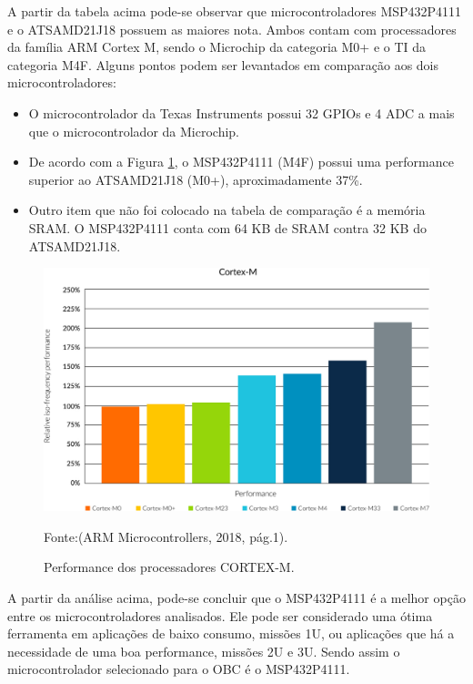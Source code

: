 A partir da tabela acima pode-se observar que microcontroladores MSP432P4111 e o ATSAMD21J18 possuem as maiores nota. Ambos contam com processadores da família ARM Cortex M, sendo o Microchip da categoria M0+ e o TI da categoria M4F. Alguns pontos podem ser levantados em comparação aos dois microcontroladores:

\begin{itemize}
\item O microcontrolador da Texas Instruments possui 32 GPIOs e 4 ADC a mais que o microcontrolador da Microchip.

\item De acordo com a Figura \ref{fig18}, o MSP432P4111 (M4F) possui uma performance superior ao ATSAMD21J18 (M0+), aproximadamente 37\%.

\item Outro item que não foi colocado na tabela de comparação é a memória SRAM. O MSP432P4111 conta com 64 KB de SRAM contra 32 KB do ATSAMD21J18.

\end{itemize}


\begin{figure}[h]

    \centering
    \caption{ Performance dos processadores CORTEX-M.}
	\includegraphics[keepaspectratio=true,scale=0.4]{figuras/arm-cortex-m-series-performance-graph.jpg}
	
	Fonte:(ARM Microcontrollers, 2018, pág.1).
	
	\label{fig18}
\end{figure}

A partir da análise acima, pode-se concluir que o MSP432P4111 é a melhor opção entre os microcontroladores analisados. Ele pode ser considerado uma ótima ferramenta em aplicações de baixo consumo, missões 1U, ou aplicações que há a necessidade de uma boa performance, missões 2U e 3U. Sendo assim o microcontrolador selecionado para o OBC é o MSP432P4111.

